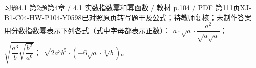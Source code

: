 \par\noindent\begin{minipage}{\linewidth}
\begin{bankitem}{习题4.1 第2题}{第4章 / 4.1 实数指数幂和幂函数 / 教材 p.104 / PDF 第111页}{XJ-B1-C04-HW-P104-Y0598}{已对照原页转写题干及公式；待教师复核；未制作答案}
用分数指数幂表示下列各式（式中字母都表示正数）：
$a\cdot\sqrt a\cdot\dfrac{a^2}{\sqrt{a\sqrt a}}$；
$\sqrt{\dfrac{a^3}b\sqrt{\dfrac{b^2}{a^6}}}$；
$\sqrt{2a^3b^5}\cdot\left(-6\sqrt a\cdot\sqrt[3]b\right)$。
\end{bankitem}
\end{minipage}\par\medskip
